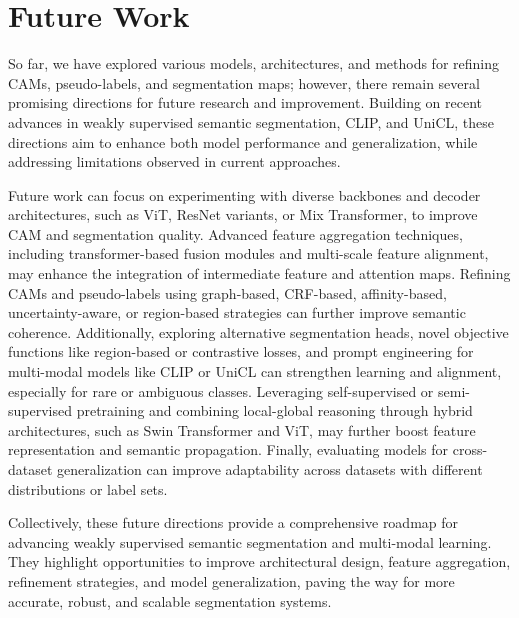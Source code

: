 \section*{Future Work}
\label{sec:future}


So far, we have explored various models, architectures, and methods for refining CAMs, pseudo-labels, and segmentation maps; however, there remain several promising directions for future research and improvement. Building on recent advances in weakly supervised semantic segmentation, CLIP, and UniCL, these directions aim to enhance both model performance and generalization, while addressing limitations observed in current approaches.

Future work can focus on experimenting with diverse backbones and decoder architectures, such as ViT, ResNet variants, or Mix Transformer, to improve CAM and segmentation quality. Advanced feature aggregation techniques, including transformer-based fusion modules and multi-scale feature alignment, may enhance the integration of intermediate feature and attention maps. Refining CAMs and pseudo-labels using graph-based, CRF-based, affinity-based, uncertainty-aware, or region-based strategies can further improve semantic coherence. Additionally, exploring alternative segmentation heads, novel objective functions like region-based or contrastive losses, and prompt engineering for multi-modal models like CLIP or UniCL can strengthen learning and alignment, especially for rare or ambiguous classes. Leveraging self-supervised or semi-supervised pretraining and combining local-global reasoning through hybrid architectures, such as Swin Transformer and ViT, may further boost feature representation and semantic propagation. Finally, evaluating models for cross-dataset generalization can improve adaptability across datasets with different distributions or label sets.

Collectively, these future directions provide a comprehensive roadmap for advancing weakly supervised semantic segmentation and multi-modal learning. They highlight opportunities to improve architectural design, feature aggregation, refinement strategies, and model generalization, paving the way for more accurate, robust, and scalable segmentation systems.